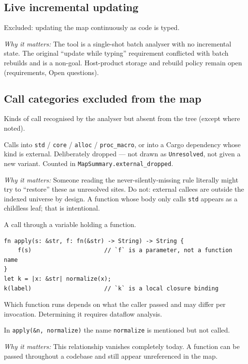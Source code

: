 \documentclass[11pt,a4paper]{article}
\newcommand{\note}{\par\smallskip\noindent\textit{Why it matters:} }
\begin{document}
\subsection{Live incremental updating}

Excluded: updating the map continuously as code is typed.

\note{The tool is a single-shot batch analyser with no incremental state. The
original ``update while typing'' requirement conflicted with batch rebuilds and
is a non-goal. Host-product storage and rebuild policy remain open
(requirements, Open questions).}

\subsection{Call categories excluded from the map}

Kinds of call recognised by the analyser but absent from the tree (except where
noted).

\begin{description}[style=nextline,leftmargin=1em]

  \item[External calls.] Calls into \verb|std| / \verb|core| / \verb|alloc| /
    \verb|proc_macro|, or into a Cargo dependency whose kind is external.
    Deliberately dropped --- not drawn as \verb|Unresolved|, not given a new
    variant. Counted in \verb|MapSummary.external_dropped|.
    \note{Someone reading the never-silently-missing rule literally might try to
    ``restore'' these as unresolved sites. Do not: external callees are outside
    the indexed universe by design. A function whose body only calls
    \verb|std| appears as a childless leaf; that is intentional.}

  \item[Indirect calls.] A call through a variable holding a function.
\begin{lstlisting}
fn apply(s: &str, f: fn(&str) -> String) -> String {
    f(s)                     // `f` is a parameter, not a function name
}
let k = |x: &str| normalize(x);
k(label)                     // `k` is a local closure binding
\end{lstlisting}
    Which function runs depends on what the caller passed and may differ per
    invocation. Determining it requires dataflow analysis.

  \item[Functions passed as values.] In \verb|apply(&n, normalize)| the name
    \verb|normalize| is mentioned but not called.
    \note{This relationship vanishes completely today. A function can be passed
    throughout a codebase and still appear unreferenced in the map.}

\end{description}
\end{document}
